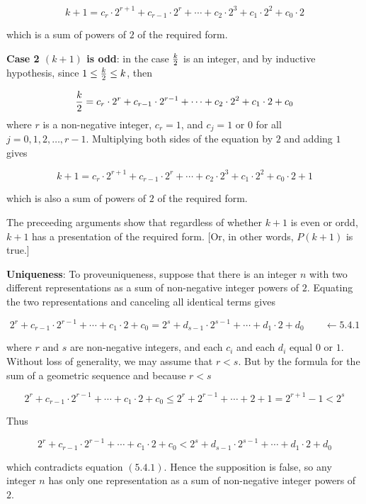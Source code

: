 $$k+1=c_r \cdot 2^{r+1}+c_{r-1}\cdot 2^r+\cdots + c_2\cdot 2^3+c_1\cdot 2^2+c_0\cdot 2$$

which is a sum of powers of $2$ of the required form.

\vskip 6pt
{\bf Case 2 $(k+1)$ is odd}: in the case $k\over 2$ is an integer, and by inductive hypothesis, since $1\leq {k\over 2}\leq k$, then

$${k\over 2}=c_r \cdot 2^r+c_{r-1}\cdot 2^{r-1}+\cdots + c_2\cdot 2^2+c_1\cdot 2+c_0$$
where $r$ is a non-negative integer, $c_r=1$, and $c_j=1$ or $0$ for all $j=0,1,2,\ldots , r-1$. Multiplying both sides of the equation by $2$ and adding $1$ gives

$$k+1=c_r \cdot 2^{r+1}+c_{r-1}\cdot 2^r+\cdots + c_2\cdot 2^3+c_1\cdot 2^2+c_0\cdot 2+1$$

which is also a sum of powers of $2$ of the required form.

\vskip 2pt
The preceeding arguments show that regardless of whether $k+1$ is even or ordd, $k+1$ has a presentation of the required form. [Or, in other words, $P(k+1)$ is true.]

\vskip 1in
{\bf Uniqueness}: To proveuniqueness, suppose that there is an integer $n$ with two different representations as a sum of non-negative integer powers of $2$. Equating the two representations and canceling all identical terms gives

$$2^r+c_{r-1}\cdot 2^{r-1}+\cdots + c_1\cdot 2+c_0=2^s+d_{s-1}\cdot 2^{s-1}+\cdots+d_1\cdot 2+d_0 \quad\quad\longleftarrow 5.4.1$$

where $r$ and $s$ are non-negative integers, and each $c_i$ and each $d_i$ equal $0$ or $1$. Without loss of generality, we may assume that $r<s$. But by the formula for the sum of a geometric sequence and because $r<s$

$$2^r+c_{r-1}\cdot 2^{r-1}+\cdots + c_1\cdot 2+c_0\leq 2^r+2^{r-1}+\cdots+ 2+1=2^{r+1}-1< 2^s$$

Thus

$$2^r+c_{r-1}\cdot 2^{r-1}+\cdots + c_1\cdot 2+c_0<2^s+d_{s-1}\cdot 2^{s-1}+\cdots+d_1\cdot 2+d_0$$

which contradicts equation $(5.4.1)$. Hence the supposition is false, so any integer $n$ has only one representation as a sum of non-negative integer powers of $2$.

\vfill\eject
